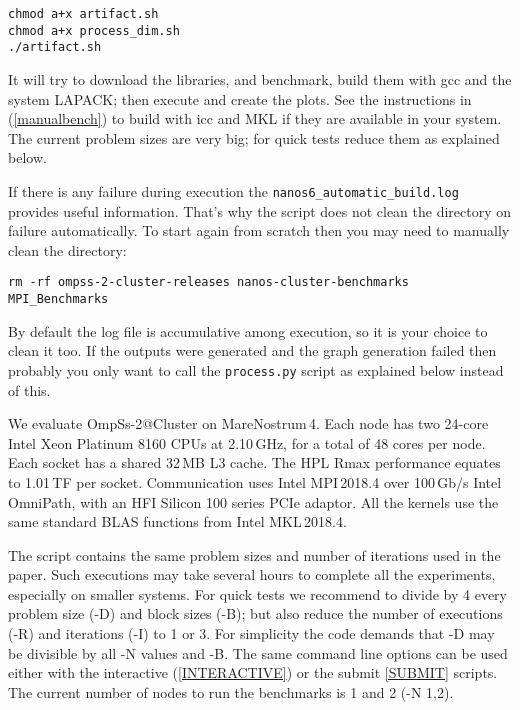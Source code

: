 \documentclass{article}
\newcommand{\code}[1]{\texttt{#1}}
\begin{document}
\begin{lstlisting}
chmod a+x artifact.sh
chmod a+x process_dim.sh
./artifact.sh
\end{lstlisting}

It will try to download the libraries, and benchmark, build them with
gcc and the system LAPACK; then execute and create the plots. See the
instructions in (\ref{manualbench}) to build with icc and MKL if they
are available in your system. The current problem sizes are very big;
for quick tests reduce them as explained below.

If there is any failure during execution the
\code{nanos6\_automatic\_build.log} provides useful
information. That's why the script does not clean the directory on
failure automatically.  To start again from scratch then you may need
to manually clean the directory:

\begin{lstlisting}
rm -rf ompss-2-cluster-releases nanos-cluster-benchmarks MPI_Benchmarks
\end{lstlisting}

By default the log file is accumulative among execution, so it is your
choice to clean it too.  If the outputs were generated and the graph
generation failed then probably you only want to call the
\code{process.py} script as explained below instead of this.

We evaluate OmpSs-2@Cluster on MareNostrum\,4. Each node has two
24-core Intel Xeon Platinum 8160 CPUs at 2.10\,GHz, for a total of 48
cores per node.  Each socket has a shared 32\,MB L3 cache.  The HPL
Rmax performance equates to 1.01\,TF per socket.  Communication uses
Intel MPI\,2018.4 over 100\,Gb/s Intel OmniPath, with an HFI Silicon
100 series PCIe adaptor.  All the kernels use the same standard BLAS
functions from Intel MKL\,2018.4.

The script contains the same problem sizes and number of iterations
used in the paper. Such executions may take several hours to complete
all the experiments, especially on smaller systems. For quick tests we
recommend to divide by 4 every problem size (-D) and block sizes (-B);
but also reduce the number of executions (-R) and iterations (-I) to 1
or 3. For simplicity the code demands that -D may be divisible by all
-N values and -B. The same command line options can be used either
with the interactive (\ref{INTERACTIVE}) or the submit \ref{SUBMIT}
scripts. The current number of nodes to run the benchmarks is 1 and 2
(-N 1,2).
\end{document}
